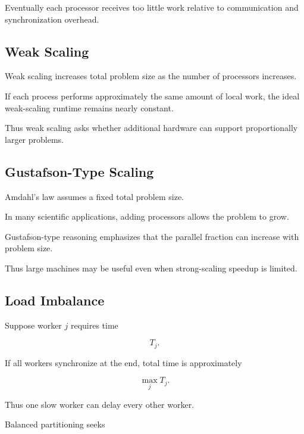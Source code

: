 Eventually each processor receives too little work relative to
communication and synchronization overhead.

\subsection{Weak Scaling}
\label{subsec:hpmc-weak-scaling}

Weak scaling increases total problem size as the number of processors
increases.

If each process performs approximately the same amount of local work, the
ideal weak-scaling runtime remains nearly constant.

Thus weak scaling asks whether additional hardware can support
proportionally larger problems.

\subsection{Gustafson-Type Scaling}
\label{subsec:gustafson-scaling}

Amdahl's law assumes a fixed total problem size.

In many scientific applications, adding processors allows the problem to
grow.

Gustafson-type reasoning emphasizes that the parallel fraction can increase
with problem size.

Thus large machines may be useful even when strong-scaling speedup is
limited.

\subsection{Load Imbalance}
\label{subsec:hpmc-load-imbalance}

Suppose worker \(j\) requires time

\[
T_j.
\]

If all workers synchronize at the end, total time is approximately

\[
\boxed{
\max_j T_j.
}
\]

Thus one slow worker can delay every other worker.

Balanced partitioning seeks

